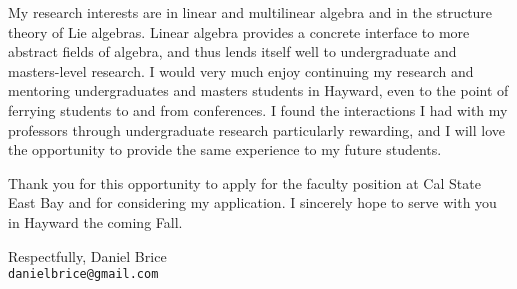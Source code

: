 \documentclass[10pt]{article}
\begin{document}
My research interests are in linear and multilinear algebra and in the structure theory of Lie algebras.
Linear algebra provides a concrete interface to more abstract fields of algebra, and thus lends itself
well to undergraduate and masters-level research. I would very much enjoy continuing my research and mentoring
undergraduates and masters students in Hayward, even to the point of ferrying students to and from conferences.
I found the interactions I had with my professors through undergraduate research particularly rewarding,
and I will love the opportunity to provide the same experience to my future students.

Thank you for this opportunity to apply for the faculty position at Cal State East Bay and for
considering my application. I sincerely hope to serve with you in Hayward the coming Fall.

Respectfully,
\vfill
Daniel Brice\\
\texttt{danielbrice@gmail.com}

\label{page:last}
\end{document}
